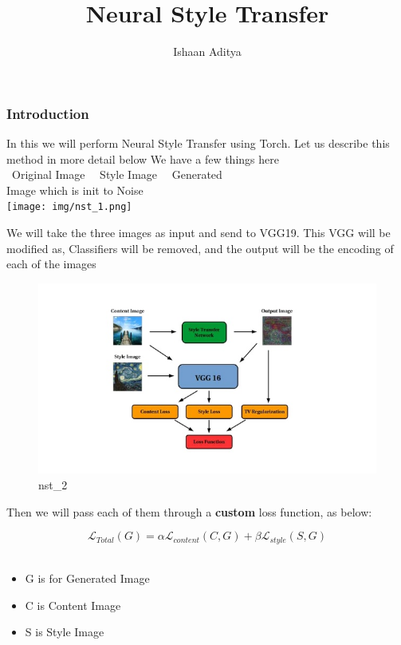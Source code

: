\documentclass[11pt]{article}
\title{Neural Style Transfer}
\providecommand{\tightlist}{%
      \setlength{\itemsep}{0pt}\setlength{\parskip}{0pt}}
\begin{document}
\author {Ishaan Aditya}
    \maketitle
    \hypertarget{introduction}{
\subsubsection{Introduction}\label{introduction}}

In this we will perform Neural Style Transfer using Torch.
Let us describe this method in more detail below
We have a few things here \\
\textbullet \ Original Image \
\textbullet \ Style Image \
\textbullet \ Generated \\
Image which is init to Noise\\
 \texttt{[image: img/nst\_1.png]}

We will take the three images as input and send to VGG19.
This VGG will be modified as, Classifiers will be removed, and the
output will be the encoding of each of the images\\

\begin{figure}
    \centering
    \includegraphics{img/nst_2.jpg}
    \caption{nst\_2}
\end{figure}

\pagebreak
Then we will pass each of them through a \textbf{custom} loss function,
as below:

\[
\mathcal{L}_{Total} (G) = \alpha \mathcal{L}_{content}(C,G) + \beta \mathcal{L}_{style} (S,G)
\]
\\
\begin{itemize}
\tightlist
\item G is for Generated Image
\item C is Content Image
\item S is Style Image
\end{itemize}
\end{document}
